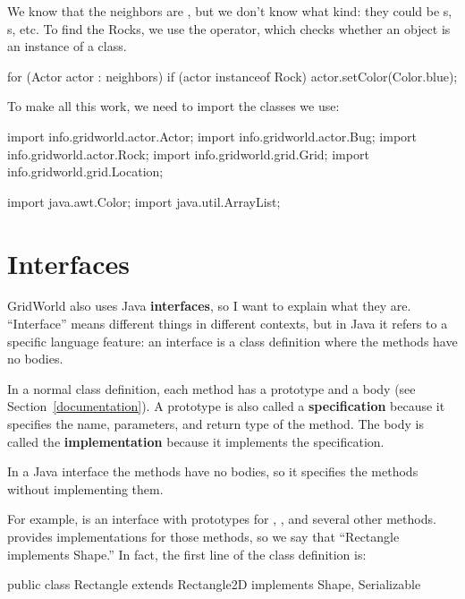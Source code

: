 We know that the neighbors are , but we don't know what kind: they could be s, s, etc.
To find the Rocks, we use the  operator, which checks whether an object is an instance of a class.

\begin{code}
        for (Actor actor : neighbors) {
            if (actor instanceof Rock) {
                actor.setColor(Color.blue);
            }
        }
\end{code}

To make all this work, we need to import the classes we use:

\begin{code}
import info.gridworld.actor.Actor;
import info.gridworld.actor.Bug;
import info.gridworld.actor.Rock;
import info.gridworld.grid.Grid;
import info.gridworld.grid.Location;

import java.awt.Color;
import java.util.ArrayList;
\end{code}


\section{Interfaces}

GridWorld also uses Java {\bf interfaces}, so I want to explain what they are.
``Interface'' means different things in different contexts, but in Java it refers to a specific language feature: an interface is a class definition where the methods have no bodies.

In a normal class definition, each method has a prototype and a body (see Section~\ref{documentation}).
A prototype is also called a {\bf specification} because it specifies the name, parameters, and return type of the method.
The body is called the {\bf implementation} because it implements the specification.

In a Java interface the methods have no bodies, so it specifies the methods without implementing them.

For example,  is an interface with prototypes for , , and several other methods.
 provides implementations for those methods, so we say that ``Rectangle implements Shape.''
In fact, the first line of the  class definition is:

\begin{code}
public class Rectangle extends Rectangle2D implements Shape, Serializable
\end{code}

